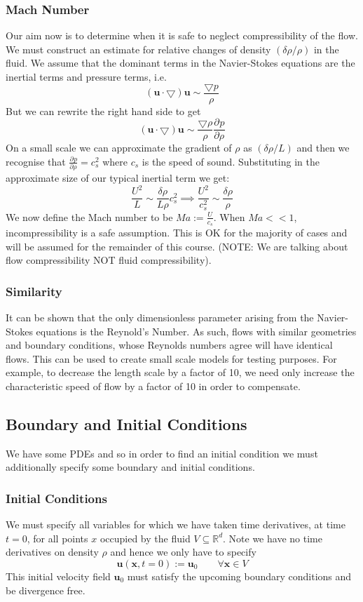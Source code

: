 \documentclass[11pt]{article}
\newcommand*{\pd}[3][]{\ensuremath{\frac{\partial^{#1} {#2}}{\partial {#3}^{#1}}}}
\newcommand{\grad}{\bigtriangledown}
\newcommand{\defeq}{:=}
\newcommand{\mv}[1]{\bm{#1}}
\newcommand{\mdf}[1]{{\color{red}#1}}
\begin{document}
\subsubsection{Mach Number}
Our aim now is to determine when it is safe to neglect compressibility of the flow. We must construct an estimate for relative changes of density $(\delta\rho / \rho)$ in the fluid.
We assume that the dominant terms in the Navier-Stokes equations are the inertial terms and pressure terms, i.e.
$$(\mv{u}\cdot\grad)\mv{u}\sim \frac{\grad p}{\rho}$$
But we can rewrite the right hand side to get
$$(\mv{u}\cdot\grad)\mv{u}\sim \frac{\grad \rho}{\rho}\pd{p}{\rho}$$
On a small scale we can approximate the gradient of $\rho$ as $(\delta\rho/L)$ and then we recognise that $\pd{p}{\rho}=c_s^2$ where $c_s$ is the speed of sound. Substituting in the approximate size of our typical inertial term we get:
$$\frac{U^2}{L}\sim \frac{\delta\rho}{L\rho}c_s^2\implies \frac{U^2}{c_s^2}\sim\frac{\delta\rho}{\rho}$$
We now define the \mdf{Mach number} to be $Ma\defeq\frac{U}{c_s}$.
When $Ma << 1 $, incompressibility is a safe assumption.
This is OK for the majority of cases and will be assumed for the remainder of this course.
(NOTE: We are talking about flow compressibility NOT fluid compressibility).
\subsubsection{Similarity}
It can be shown that the only dimensionless parameter arising from the Navier-Stokes equations is the Reynold's Number.
As such, flows with similar geometries and boundary conditions, whose Reynolds numbers agree will have identical flows.
This can be used to create small scale models for testing purposes.
For example, to decrease the length scale by a factor of 10, we need only increase the characteristic speed of flow by a factor of 10 in order to compensate.

\subsection{Boundary and Initial Conditions}
We have some PDEs and so in order to find an initial condition we must additionally specify some boundary and initial conditions.

\subsubsection{Initial Conditions}
We must specify all variables for which we have taken time derivatives, at time $t=0$, for all points $x$ occupied by the fluid $V\subseteq\mathbb{R}^d$. Note we have no time derivatives on density $\rho$ and hence we only have to specify
$$\mv{u}(\mv{x},t=0)\defeq\mv{u}_0\quad\quad\forall\mv{x}\in V$$
This \mdf{initial velocity field} $\mv{u}_0$ must satisfy the upcoming boundary conditions and be divergence free.
\end{document}
